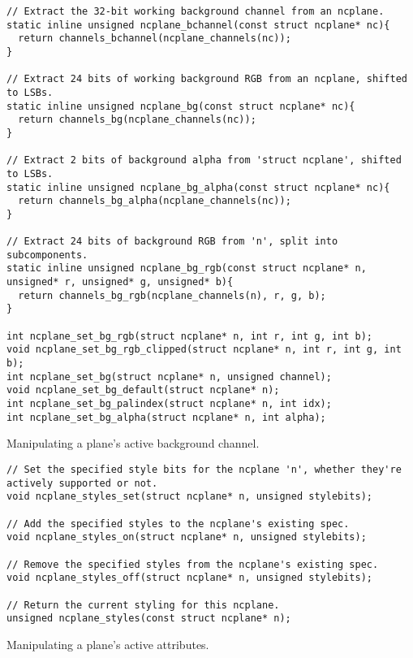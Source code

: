 \begin{listing}[!htb]
\begin{verbatim}
// Extract the 32-bit working background channel from an ncplane.
static inline unsigned ncplane_bchannel(const struct ncplane* nc){
  return channels_bchannel(ncplane_channels(nc));
}

// Extract 24 bits of working background RGB from an ncplane, shifted to LSBs.
static inline unsigned ncplane_bg(const struct ncplane* nc){
  return channels_bg(ncplane_channels(nc));
}

// Extract 2 bits of background alpha from 'struct ncplane', shifted to LSBs.
static inline unsigned ncplane_bg_alpha(const struct ncplane* nc){
  return channels_bg_alpha(ncplane_channels(nc));
}

// Extract 24 bits of background RGB from 'n', split into subcomponents.
static inline unsigned ncplane_bg_rgb(const struct ncplane* n, unsigned* r, unsigned* g, unsigned* b){
  return channels_bg_rgb(ncplane_channels(n), r, g, b);
}

int ncplane_set_bg_rgb(struct ncplane* n, int r, int g, int b);
void ncplane_set_bg_rgb_clipped(struct ncplane* n, int r, int g, int b);
int ncplane_set_bg(struct ncplane* n, unsigned channel);
void ncplane_set_bg_default(struct ncplane* n);
int ncplane_set_bg_palindex(struct ncplane* n, int idx);
int ncplane_set_bg_alpha(struct ncplane* n, int alpha);
\end{verbatim}
\caption{Manipulating a plane's active background channel.}
\label{listing:planebg}
\end{listing}

\begin{listing}[!htb]
\begin{verbatim}
// Set the specified style bits for the ncplane 'n', whether they're actively supported or not.
void ncplane_styles_set(struct ncplane* n, unsigned stylebits);

// Add the specified styles to the ncplane's existing spec.
void ncplane_styles_on(struct ncplane* n, unsigned stylebits);

// Remove the specified styles from the ncplane's existing spec.
void ncplane_styles_off(struct ncplane* n, unsigned stylebits);

// Return the current styling for this ncplane.
unsigned ncplane_styles(const struct ncplane* n);
\end{verbatim}
\caption{Manipulating a plane's active attributes.}
\label{listing:planeattr}
\end{listing}

